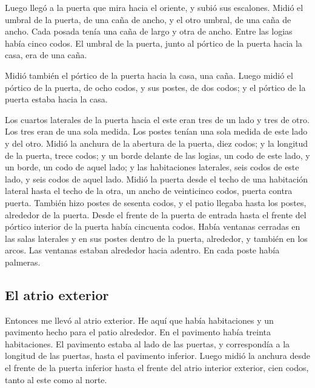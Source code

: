 \begin{paracol}{2}
 Luego llegó a la puerta que mira hacia el oriente, y
subió sus escalones. Midió el umbral de la puerta, de una caña de ancho,
y el otro umbral, de una caña de ancho.  Cada posada tenía
una caña de largo y otra de ancho. Entre las logias había cinco codos.
El umbral de la puerta, junto al pórtico de la puerta hacia la casa, era
de una caña.

 Midió también el pórtico de la puerta hacia la casa, una
caña.  Luego midió el pórtico de la puerta, de ocho codos,
y sus postes, de dos codos; y el pórtico de la puerta estaba hacia la
casa.

 Los cuartos laterales de la puerta hacia el este eran
tres de un lado y tres de otro. Los tres eran de una sola medida. Los
postes tenían una sola medida de este lado y del otro. 
Midió la anchura de la abertura de la puerta, diez codos; y la longitud
de la puerta, trece codos;  y un borde delante de las
logias, un codo de este lado, y un borde, un codo de aquel lado; y las
habitaciones laterales, seis codos de este lado, y seis codos de aquel
lado.  Midió la puerta desde el techo de una habitación
lateral hasta el techo de la otra, un ancho de veinticinco codos, puerta
contra puerta.  También hizo postes de sesenta codos, y
el patio llegaba hasta los postes, alrededor de la puerta.
 Desde el frente de la puerta de entrada hasta el frente
del pórtico interior de la puerta había cincuenta codos. 
Había ventanas cerradas en las salas laterales y en sus postes dentro de
la puerta, alrededor, y también en los arcos. Las ventanas estaban
alrededor hacia adentro. En cada poste había palmeras.

\hypertarget{el-atrio-exterior}{%
\subsection{El atrio exterior}\label{el-atrio-exterior}}

 Entonces me llevó al atrio exterior. He aquí que había
habitaciones y un pavimento hecho para el patio alrededor. En el
pavimento había treinta habitaciones.  El pavimento
estaba al lado de las puertas, y correspondía a la longitud de las
puertas, hasta el pavimento inferior.  Luego midió la
anchura desde el frente de la puerta inferior hasta el frente del atrio
interior exterior, cien codos, tanto al este como al norte.


\end{paracol}
